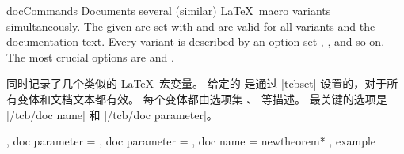 \begin{docEnvironment}[doclang/environment content=command description,doc new=2020-04-22]
  {docCommands}{}
Documents several (similar) \LaTeX\ macro variants simultaneously.
The given  are set with  and are valid for
all variants and the documentation text.
Every variant is described by an option set , , and so on.
The most crucial options are  and .

同时记录了几个类似的 \LaTeX\ 宏变量。 给定的  是通过 |tcbset| 设置的，对于所有变体和文档文本都有效。 每个变体都由选项集 、 等描述。 最关键的选项是 |/tcb/doc name| 和 |/tcb/doc parameter|。
\begin{dispExample}
\begin{docCommands}[
  doc no index,  %
  doc name      = newtheorem,
  doc parameter = \marg{envname},
]
{
  {  },
  { doc parameter =  },
  { doc parameter =  },
  { doc name      = newtheorem* },
}
example
\end{docCommands}
\end{dispExample}
\end{docEnvironment}